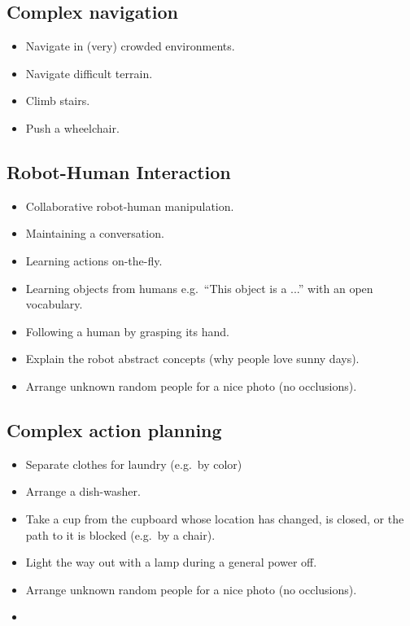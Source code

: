 \subsection{Complex navigation}
\begin{itemize}
	\item Navigate in (very) crowded environments.
	\item Navigate difficult terrain.
	\item Climb stairs.
	\item Push a wheelchair.
\end{itemize}

\subsection{Robot-Human Interaction}
\begin{itemize}
	\item Collaborative robot-human manipulation.
	\item Maintaining a conversation.
	\item Learning actions on-the-fly.
	\item Learning objects from humans e.g.~\enquote{This object is a ...} with an open vocabulary.
	\item Following a human by grasping its hand.
	\item Explain the robot abstract concepts (why people love sunny days).
	\item Arrange unknown random people for a nice photo (no occlusions).
\end{itemize}

\subsection{Complex action planning}
\begin{itemize}
	\item Separate clothes for laundry (e.g.~by color)
	\item Arrange a dish-washer.
	\item Take a cup from the cupboard whose location has changed, is closed, or the path to it is blocked (e.g.~by a chair).
	\item Light the way out with a lamp during a general power off.
	\item Arrange unknown random people for a nice photo (no occlusions).
	\item
\end{itemize}

